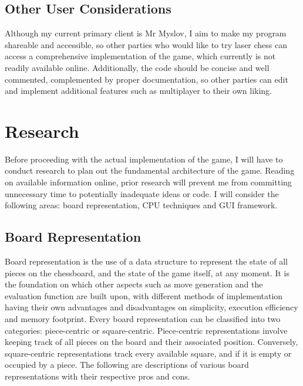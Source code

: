 \documentclass[../main/main.tex]{subfiles}
\begin{document}
\subsection{Other User Considerations}
Although my current primary client is Mr Myslov, I aim to make my program shareable and accessible, so other parties who would like to try laser chess can access a comprehensive implementation of the game, which currently is not readily available online. Additionally, the code should be concise and well commented, complemented by proper documentation, so other parties can edit and implement additional features such as multiplayer to their own liking.

\section{Research}
Before proceeding with the actual implementation of the game, I will have to conduct research to plan out the fundamental architecture of the game. Reading on available information online, prior research will prevent me from committing unnecessary time to potentially inadequate ideas or code. I will consider the following areas: board representation, CPU techniques and GUI framework.

\subsection{Board Representation}
Board representation is the use of a data structure to represent the state of all pieces on the chessboard, and the state of the game itself, at any moment. It is the foundation on which other aspects such as move generation and the evaluation function are built upon, with different methods of implementation having their own advantages and disadvantages on simplicity, execution efficiency and memory footprint. Every board representation can be classified into two categories: piece-centric or square-centric. Piece-centric representations involve keeping track of all pieces on the board and their associated position. Conversely, square-centric representations track every available square, and if it is empty or occupied by a piece. The following are descriptions of various board representations with their respective pros and cons.
\end{document}
